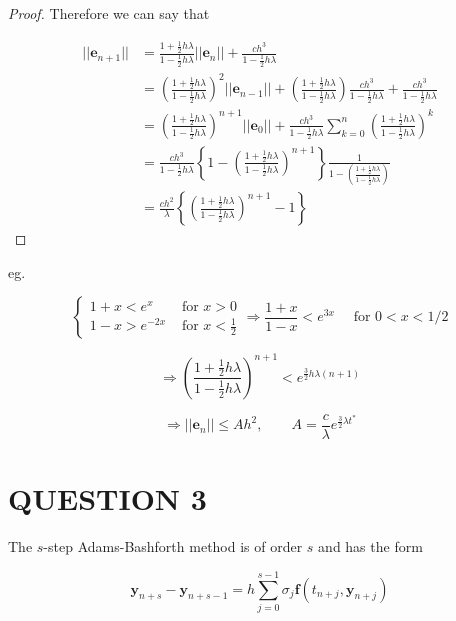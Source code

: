 \documentclass[a4paper]{article}
\begin{document}
\begin{proof}
	Therefore we can say that 
	
	\begin{align*}
	| | \mathbf{e}_{n+1} | |& = \frac{1 + \frac{1}{2}h\lambda}{1 -\frac{1}{2} h \lambda } | | \mathbf{e}_{n} | | + \frac{ch^{3}}{1 - \frac{1}{2} h \lambda} \\
	& = \left( \frac{1 + \frac{1}{2}h\lambda}{1 -\frac{1}{2} h \lambda }   \right)^{2} | | \mathbf{e}_{n-1} | | +  \left( \frac{1 + \frac{1}{2}h\lambda}{1 -\frac{1}{2} h \lambda }   \right) \frac{ch^{3}}{1 - \frac{1}{2} h \lambda} + \frac{ch^{3}}{1 - \frac{1}{2} h \lambda} \\
	& = \left( \frac{1 + \frac{1}{2}h\lambda}{1 -\frac{1}{2} h \lambda }   \right)^{n+1} | | \mathbf{e}_{0} | | +  \frac{ch^{3}}{1 - \frac{1}{2} h \lambda} \sum_{k=0}^{n} \left( \frac{1 + \frac{1}{2}h\lambda}{1 -\frac{1}{2} h \lambda }   \right)^{k}  \\
	& = \frac{ch^{3}}{1 - \frac{1}{2} h \lambda} \left\{   1 - \left( \frac{1 + \frac{1}{2}h\lambda}{1 -\frac{1}{2} h \lambda }   \right)^{n+1}   \right\} \frac{1}{1 - \left( \frac{1 + \frac{1}{2}h\lambda}{1 -\frac{1}{2} h \lambda }   \right)} \\
	& = \frac{ch^{2}}{\lambda} \left\{  \left( \frac{1 + \frac{1}{2}h\lambda}{1 -\frac{1}{2} h \lambda }  \right)^{n+1} - 1   \right\} 
	\end{align*}
\end{proof}


eg.

\[ \begin{cases} 1 + x < e^{x}  & \text{ for } x > 0  \\ 1 - x > e^{-2x} & \text{ for } x < \frac{1}{2} \end{cases} \Rightarrow \frac{1+x}{1-x} < e^{3x} \quad \text{ for } 0 < x < 1/2 \]

\[ \Rightarrow \left( \frac{1 + \frac{1}{2}h\lambda}{1 -\frac{1}{2} h \lambda }  \right)^{n+1} < e^{\frac{3}{2} h \lambda (n+1)} \]

\[ \Rightarrow | | \mathbf{e}_{n} | | \leq A h^{2}, \qquad A = \frac{c}{\lambda} e^{\frac{3}{2} \lambda t^{*}} \]

\section{QUESTION 3}
The $ s $-step Adams-Bashforth method is of order $ s $ and has the form

\[ \mathbf{y}_{n+s} - \mathbf{y}_{n+s-1} = h \sum_{j=0}^{s-1} \sigma_{j} \mathbf{f}(t_{n+j},\mathbf{y}_{n+j}) \]
\end{document}
